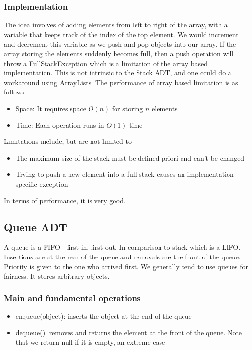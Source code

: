\documentclass[a4paper]{article}
\theoremstyle{plain}
\theoremstyle{definition}
\newtheorem{defn}{Definition}[section]
\theoremstyle{remark}
\begin{document}
\subsubsection{Implementation}
The idea involves of adding elements from left to right of the array, with a variable that keeps track of the index of the top element. We would increment and decrement this variable as we push and pop objects into our array. If the array storing the elements suddenly becomes full, then a push operation will throw a FullStackException which is a limitation of the array based implementation. This is not intrinsic to the Stack ADT, and one could do a workaround using ArrayLists. The performance of array based limitation is as follows
\begin{itemize}
	\item Space: It requires space $O(n)$ for storing $n$ elements
	\item Time: Each operation runs in $O(1)$ time
\end{itemize}
Limitations include, but are not limited to
\begin{itemize}
	\item The maximum size of the stack must be defined priori and can't be changed
	\item Trying to push a new element into a full stack causes an implementation-specific exception
\end{itemize}
In terms of performance, it is very good.
\subsection{Queue ADT}
\begin{tcolorbox}[colback=black!3!white,colframe=black!60!white,title=\begin{defn}Queue \label{Queue}\end{defn}]
A queue is a FIFO - first-in, first-out. In comparison to stack which is a LIFO. Insertions are at the rear of the queue and removals are the front of the queue. Priority is given to the one who arrived first. We generally tend to use queues for fairness. It stores arbitrary objects.
\end{tcolorbox}
\subsubsection{Main and fundamental operations}
\begin{itemize}
	\item enqueue(object): inserts the object at the end of the queue
	\item dequeue(): removes and returns the element at the front of the queue. Note that we return null if it is empty, an extreme case
\end{itemize}
\end{document}
